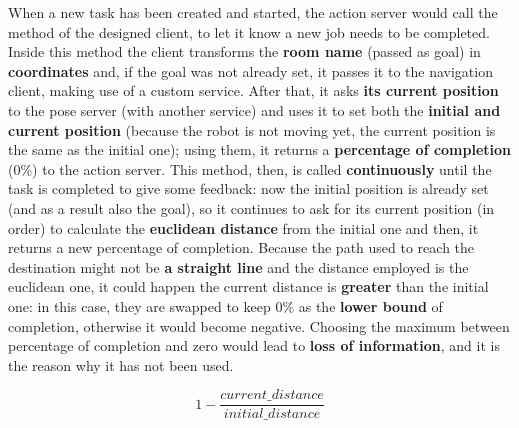 When a new task has been created and started, the action server would call the  method of the designed client, to let it know a new job needs to be completed.
Inside this method the client transforms the \textbf{room name} (passed as goal) in \textbf{coordinates} and, if the goal was not already set, it passes it to the navigation client, making use of a custom service. After that, it asks \textbf{its current position} to the pose server (with another service) and uses it to set both the \textbf{initial and current position} (because the robot is not moving yet, the current position is the same as the initial one); using them, it returns a \textbf{percentage of completion} (0\%) to the action server.
This method, then, is called \textbf{continuously} until the task is completed to give some feedback: now the initial position is already set (and as a result also the goal), so it continues to ask for its current position (in order) to calculate the \textbf{euclidean distance} from the initial one and then, it returns a new percentage of completion. Because the path used to reach the destination might not be \textbf{a straight line} and the distance employed is the euclidean one, it could happen the current distance is \textbf{greater} than the initial one: in this case, they are swapped to keep 0\% as the \textbf{lower bound} of completion, otherwise it would become negative. Choosing the maximum between percentage of completion and zero would lead to \textbf{loss of information}, and it is the reason why it has not been used. 

$$ 1-\dfrac{current\_distance}{initial\_distance} $$ %